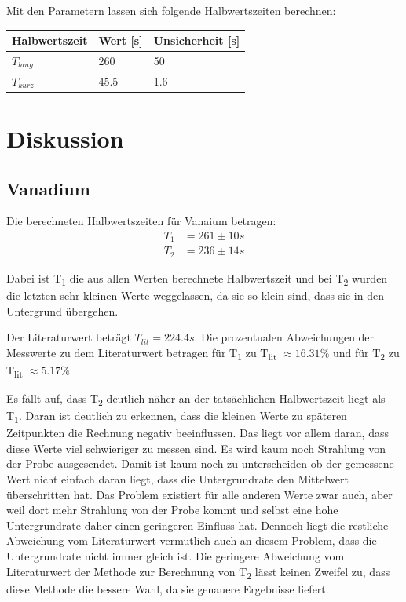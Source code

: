 \noindent Mit den Parametern lassen sich folgende Halbwertszeiten berechnen:

\begin{tabular}{ll@{${}\pm{}$}l}
    \toprule
    Halbwertszeit & Wert [s] & Unsicherheit [s] \\
    \midrule
    $T_{lang}$ & 260 & 50 \\
    $T_{kurz}$ & 45.5 & 1.6 \\
    \bottomrule   
\end{tabular}

\section{Diskussion}

\subsection{Vanadium}

Die berechneten Halbwertszeiten für Vanaium betragen: 
\begin{align}
    T_1 &= 261 \pm 10 s \nonumber \\
    T_2 &= 236 \pm 14 s \nonumber
\end{align}

\noindent Dabei ist T\textsubscript{1} die aus allen Werten berechnete Halbwertszeit und bei T\textsubscript{2} wurden die letzten sehr kleinen Werte weggelassen, da sie so klein sind, dass sie in den Untergrund übergehen. 

\noindent Der Literaturwert beträgt $T_{lit}=224.4s$.
Die prozentualen Abweichungen der Messwerte zu dem Literaturwert betragen für T\textsubscript{1} zu T\textsubscript{lit} $\approx 16.31 \%$ und für T\textsubscript{2} zu T\textsubscript{lit} $\approx 5.17 \%$

\noindent Es fällt auf, dass T\textsubscript{2} deutlich näher an der tatsächlichen Halbwertszeit liegt als T\textsubscript{1}. 
Daran ist deutlich zu erkennen, dass die kleinen Werte zu späteren Zeitpunkten die Rechnung negativ beeinflussen. Das liegt vor allem daran, dass diese Werte viel schwieriger zu messen sind. Es wird kaum noch Strahlung von der Probe ausgesendet. Damit ist kaum noch zu unterscheiden ob der gemessene Wert nicht einfach daran liegt, dass die Untergrundrate den Mittelwert überschritten hat. Das Problem existiert für alle anderen Werte zwar auch, aber weil dort mehr Strahlung von der Probe kommt und selbst eine hohe Untergrundrate daher einen geringeren Einfluss hat. Dennoch liegt die restliche Abweichung vom Literaturwert vermutlich auch an diesem Problem, dass die Untergrundrate nicht immer gleich ist. 
Die geringere Abweichung vom Literaturwert der Methode zur Berechnung von T\textsubscript{2} lässt keinen Zweifel zu, dass diese Methode die bessere Wahl, da sie genauere Ergebnisse liefert. 

